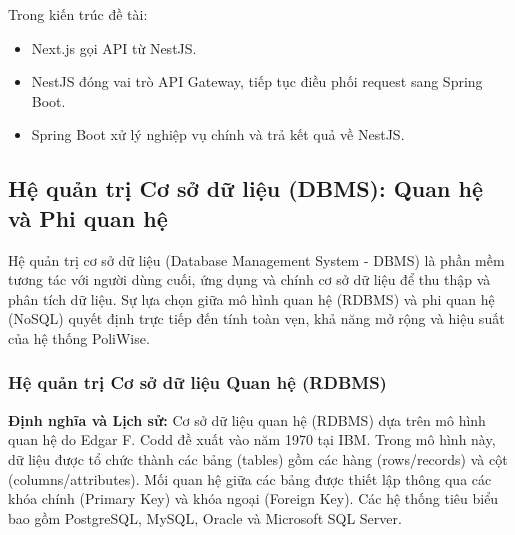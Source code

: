 \documentclass[12pt,a4paper]{report}
\begin{document}
Trong kiến trúc đề tài:
\begin{itemize}
    \item Next.js gọi API từ NestJS.
    \item NestJS đóng vai trò API Gateway, tiếp tục điều phối request sang Spring Boot.
    \item Spring Boot xử lý nghiệp vụ chính và trả kết quả về NestJS.
\end{itemize}

\subsection{Hệ quản trị Cơ sở dữ liệu (DBMS): Quan hệ và Phi quan hệ}
Hệ quản trị cơ sở dữ liệu (Database Management System - DBMS) là phần mềm tương tác với người dùng cuối, ứng dụng và chính cơ sở dữ liệu để thu thập và phân tích dữ liệu. Sự lựa chọn giữa mô hình quan hệ (RDBMS) và phi quan hệ (NoSQL) quyết định trực tiếp đến tính toàn vẹn, khả năng mở rộng và hiệu suất của hệ thống PoliWise.

\subsubsection{Hệ quản trị Cơ sở dữ liệu Quan hệ (RDBMS)}
\textbf{Định nghĩa và Lịch sử:} Cơ sở dữ liệu quan hệ (RDBMS) dựa trên mô hình quan hệ do Edgar F. Codd đề xuất vào năm 1970 tại IBM. Trong mô hình này, dữ liệu được tổ chức thành các bảng (tables) gồm các hàng (rows/records) và cột (columns/attributes). Mối quan hệ giữa các bảng được thiết lập thông qua các khóa chính (Primary Key) và khóa ngoại (Foreign Key). Các hệ thống tiêu biểu bao gồm PostgreSQL, MySQL, Oracle và Microsoft SQL Server.
\end{document}
